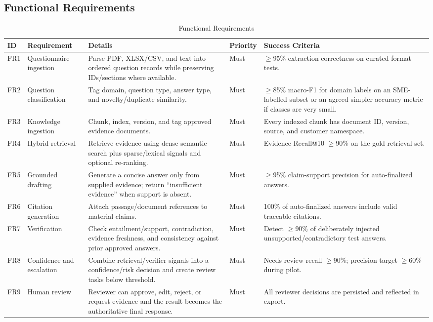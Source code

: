 \documentclass[11pt,journal,onecolumn]{IEEEtran}
\begin{document}
\subsection{Functional Requirements}
\begin{table}[H]
\centering
\caption{Functional Requirements}
\small
\begin{tabularx}{\textwidth}{L{0.07\textwidth}L{0.24\textwidth}Y L{0.09\textwidth}Y}
\toprule
\textbf{ID} & \textbf{Requirement} & \textbf{Details} & \textbf{Priority} & \textbf{Success Criteria} \\
\midrule
FR1 & Questionnaire ingestion & Parse PDF, XLSX/CSV, and text into ordered question records while preserving IDs/sections where available. & Must & $\geq$95\% extraction correctness on curated format tests. \\
FR2 & Question classification & Tag domain, question type, answer type, and novelty/duplicate similarity. & Must & $\geq$85\% macro-F1 for domain labels on an SME-labelled subset or an agreed simpler accuracy metric if classes are very small. \\
FR3 & Knowledge ingestion & Chunk, index, version, and tag approved evidence documents. & Must & Every indexed chunk has document ID, version, source, and customer namespace. \\
FR4 & Hybrid retrieval & Retrieve evidence using dense semantic search plus sparse/lexical signals and optional re-ranking. & Must & Evidence Recall@10 $\geq$90\% on the gold retrieval set. \\
FR5 & Grounded drafting & Generate a concise answer only from supplied evidence; return ``insufficient evidence'' when support is absent. & Must & $\geq$95\% claim-support precision for auto-finalized answers. \\
FR6 & Citation generation & Attach passage/document references to material claims. & Must & 100\% of auto-finalized answers include valid traceable citations. \\
FR7 & Verification & Check entailment/support, contradiction, evidence freshness, and consistency against prior approved answers. & Must & Detect $\geq$90\% of deliberately injected unsupported/contradictory test answers. \\
FR8 & Confidence and escalation & Combine retrieval/verifier signals into a confidence/risk decision and create review tasks below threshold. & Must & Needs-review recall $\geq$90\%; precision target $\geq$60\% during pilot. \\
FR9 & Human review & Reviewer can approve, edit, reject, or request evidence and the result becomes the authoritative final response. & Must & All reviewer decisions are persisted and reflected in export. \\

\end{tabularx}
\end{table}
\end{document}
